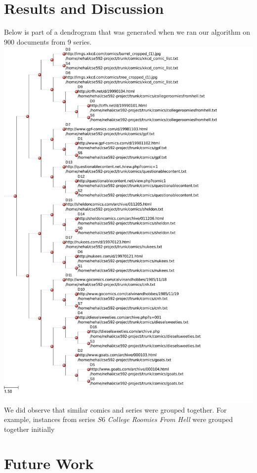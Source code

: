 \documentclass[11pt,twocolumn]{article}
\begin{document}
\section{Results and Discussion}
Below is part of a dendrogram that was generated when we ran our algorithm on 900 documents from 9 series.
\includegraphics[height=\textheight]{demo1.pdf}
We did observe that similar comics and series were grouped together. For example, instances from series $S6$ \emph{College Roomies From Hell} were grouped together initially


\section{Future Work}
\end{document}
